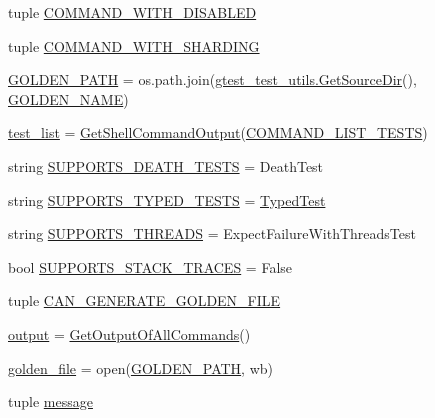 \begin{DoxyCompactItemize}
tuple \hyperlink{namespacegtest__output__test_a0ef963a39dc8e53616ba2dab9f128def}{C\+O\+M\+M\+A\+N\+D\+\_\+\+W\+I\+T\+H\+\_\+\+D\+I\+S\+A\+B\+L\+ED}
\item 
tuple \hyperlink{namespacegtest__output__test_a462eef2a00782001d491b7a38a847bec}{C\+O\+M\+M\+A\+N\+D\+\_\+\+W\+I\+T\+H\+\_\+\+S\+H\+A\+R\+D\+I\+NG}
\item 
\hyperlink{namespacegtest__output__test_aa592d897eeba0ac7e1a3c7d84f182c11}{G\+O\+L\+D\+E\+N\+\_\+\+P\+A\+TH} = os.\+path.\+join(\hyperlink{namespacegtest__test__utils_aaff66cb0980804d8bd57dc719d4b5518}{gtest\+\_\+test\+\_\+utils.\+Get\+Source\+Dir}(), \hyperlink{namespacegtest__output__test_a317ece7d11d9103a7bdbf0320b64a981}{G\+O\+L\+D\+E\+N\+\_\+\+N\+A\+ME})
\item 
\hyperlink{namespacegtest__output__test_aec4b3602697dfdee3283be82c5fe6232}{test\+\_\+list} = \hyperlink{namespacegtest__output__test_a0dbdd37611259249a58ab13ed60d8172}{Get\+Shell\+Command\+Output}(\hyperlink{namespacegtest__output__test_ad57de209fb07e1002c8a929dd8a15dc9}{C\+O\+M\+M\+A\+N\+D\+\_\+\+L\+I\+S\+T\+\_\+\+T\+E\+S\+TS})
\item 
string \hyperlink{namespacegtest__output__test_a401e837dae10d6c728bd74684884a77f}{S\+U\+P\+P\+O\+R\+T\+S\+\_\+\+D\+E\+A\+T\+H\+\_\+\+T\+E\+S\+TS} = \textquotesingle{}Death\+Test\textquotesingle{}
\item 
string \hyperlink{namespacegtest__output__test_aa762abdf62ac6efe1aa2405b3f506380}{S\+U\+P\+P\+O\+R\+T\+S\+\_\+\+T\+Y\+P\+E\+D\+\_\+\+T\+E\+S\+TS} = \textquotesingle{}\hyperlink{classTypedTest}{Typed\+Test}\textquotesingle{}
\item 
string \hyperlink{namespacegtest__output__test_a9c611ee196914defbb5d32a47c606640}{S\+U\+P\+P\+O\+R\+T\+S\+\_\+\+T\+H\+R\+E\+A\+DS} = \textquotesingle{}Expect\+Failure\+With\+Threads\+Test\textquotesingle{}
\item 
bool \hyperlink{namespacegtest__output__test_a1e8e722c50268029e33d6fde753cff54}{S\+U\+P\+P\+O\+R\+T\+S\+\_\+\+S\+T\+A\+C\+K\+\_\+\+T\+R\+A\+C\+ES} = False
\item 
tuple \hyperlink{namespacegtest__output__test_aa370a0da630f54a564d79507df196854}{C\+A\+N\+\_\+\+G\+E\+N\+E\+R\+A\+T\+E\+\_\+\+G\+O\+L\+D\+E\+N\+\_\+\+F\+I\+LE}
\item 
\hyperlink{namespacegtest__output__test_a1984d02025db23de921254c2f2638dbb}{output} = \hyperlink{namespacegtest__output__test_a9d88a4a9a91b97a369abac2170a23ebe}{Get\+Output\+Of\+All\+Commands}()
\item 
\hyperlink{namespacegtest__output__test_a0a02ae5e249d93c376bbce6fb87f9405}{golden\+\_\+file} = open(\hyperlink{namespacegtest__output__test_aa592d897eeba0ac7e1a3c7d84f182c11}{G\+O\+L\+D\+E\+N\+\_\+\+P\+A\+TH}, \textquotesingle{}wb\textquotesingle{})
\item 
tuple \hyperlink{namespacegtest__output__test_ac696d0798ad7d08cb2e61070824750e2}{message}
\end{DoxyCompactItemize}



